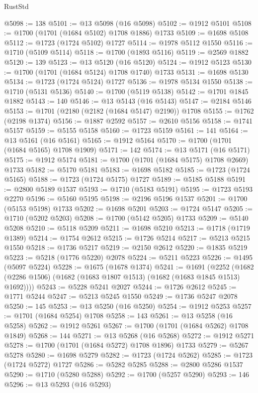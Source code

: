 \begin{lexlean}{RustStd}
\begin{coremodule}
@5098 := 138
@5101 := @13 @5098 (@16 @5098)
@5102 := @1912 @5101
@5108 := @1700 (@1701 (@1684 @5102) @1708 @1886) @1733
@5109 := @1698 @5108
@5112 := @1723 (@1724 @5102) @1727
@5114 := @1978 @5112 @1550
@5116 := @1710 (@5109 @5114)
@5118 := @1700 (@1893 @5116)
@5119 := @2569 @1882
@5120 := 139
@5123 := @13 @5120 (@16 @5120)
@5124 := @1912 @5123
@5130 := @1700 (@1701 (@1684 @5124) @1708 @1740) @1733
@5131 := @1698 @5130
@5134 := @1723 (@1724 @5124) @1727
@5136 := @1978 @5134 @1550
@5138 := @1710 (@5131 @5136)
@5140 := @1700 (@5119 @5138)
@5142 := @1701 @1845 @1882
@5143 := 140
@5146 := @13 @5143 (@16 @5143)
@5147 := @2184 @5146
@5153 := @1701 (@2180 (@2182 (@1684 @5147) @2190)) @1708
@5155 := @1762 (@2198 @1374)
@5156 := @1887 @2592
@5157 := @2610 @5156
@5158 := @1741 @5157
@5159 := @5155 @5158
@5160 := @1723 @5159
@5161 := 141
@5164 := @13 @5161 (@16 @5161)
@5165 := @1912 @5164
@5170 := @1700 (@1701 (@1684 @5165) @1708 @1909)
@5171 := 142
@5174 := @13 @5171 (@16 @5171)
@5175 := @1912 @5174
@5181 := @1700 (@1701 (@1684 @5175) @1708 @2669) @1733
@5182 := @5170 @5181
@5183 := @1698 @5182
@5185 := @1723 (@1724 @5165)
@5188 := @1723 (@1724 @5175) @1727
@5189 := @5185 @5188
@5191 := @2800 @5189 @1537
@5193 := @1710 (@5183 @5191)
@5195 := @1723 @5193 @2270
@5196 := @5160 @5195
@5198 := @2196 @5196 @1537
@5201 := @1700 (@5153 @5198) @1733
@5202 := @1698 @5201
@5203 := @1724 @5147
@5205 := @1710 (@5202 @5203)
@5208 := @1700 (@5142 @5205) @1733
@5209 := @5140 @5208
@5210 := @5118 @5209
@5211 := @1698 @5210
@5213 := @1718 (@1719 @1389)
@5214 := @1754 @2612
@5215 := @1726 @5214
@5217 := @5213 @5215 @1550
@5218 := @1736 @5217
@5219 := @2150 @2612
@5220 := @1835 @5219
@5223 := @5218 (@1776 @5220) @2078
@5224 := @5211 @5223
@5226 := @1495 (@5097 @5224)
@5228 := @1675 (@1678 @1374)
@5241 := @1691
    (@2252 (@1682 (@2286 @1506) (@1682 (@1683 @1807 @1513) (@1682 (@1683 @1845 @1513) @1692))))
@5243 := @5228 @5241 @2027
@5244 := @1726 @2612
@5245 := @1771 @5244
@5247 := @5213 @5245 @1550
@5249 := @1736 @5247 @2078
@5250 := 145
@5253 := @13 @5250 (@16 @5250)
@5254 := @1912 @5253
@5257 := @1701 (@1684 @5254) @1708
@5258 := 143
@5261 := @13 @5258 (@16 @5258)
@5262 := @1912 @5261
@5267 := @1700 (@1701 (@1684 @5262) @1708 @1849)
@5268 := 144
@5271 := @13 @5268 (@16 @5268)
@5272 := @1912 @5271
@5278 := @1700 (@1701 (@1684 @5272) @1708 @1896) @1733
@5279 := @5267 @5278
@5280 := @1698 @5279
@5282 := @1723 (@1724 @5262)
@5285 := @1723 (@1724 @5272) @1727
@5286 := @5282 @5285
@5288 := @2800 @5286 @1537
@5290 := @1710 (@5280 @5288)
@5292 := @1700 (@5257 @5290)
@5293 := 146
@5296 := @13 @5293 (@16 @5293)

\end{coremodule}
\end{lexlean}
